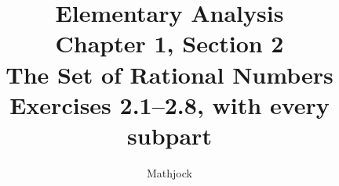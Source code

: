 
\title{\textbf{Elementary Analysis}\\[0.3em]
Chapter 1, Section 2\\[0.3em]
\large The Set of Rational Numbers\\
Exercises 2.1--2.8, with every subpart}
\author{Mathjock}
\date{}

\maketitle
\bookinfo
\tableofcontents
\clearpage
\setcounter{section}{1}


